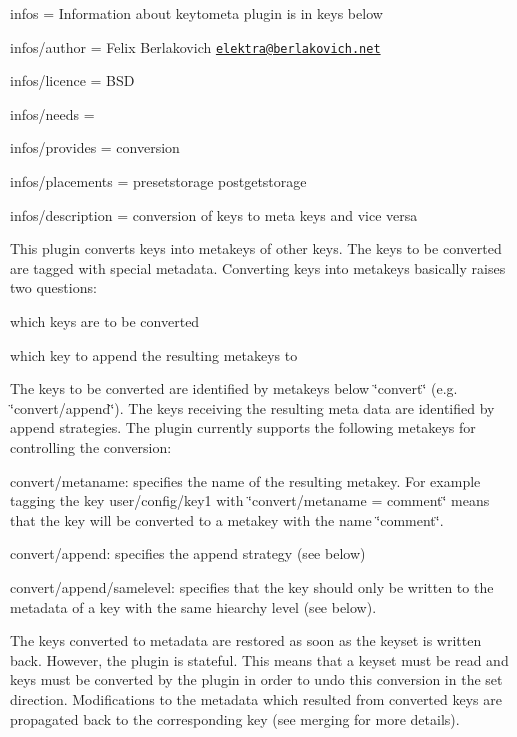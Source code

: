 
\begin{DoxyItemize}
\item infos = Information about keytometa plugin is in keys below
\item infos/author = Felix Berlakovich \href{mailto:elektra@berlakovich.net}{\tt elektra@berlakovich.\+net}
\item infos/licence = B\+S\+D
\item infos/needs =
\item infos/provides = conversion
\item infos/placements = presetstorage postgetstorage
\item infos/description = conversion of keys to meta keys and vice versa
\end{DoxyItemize}

This plugin converts keys into metakeys of other keys. The keys to be converted are tagged with special metadata. Converting keys into metakeys basically raises two questions\+:
\begin{DoxyItemize}
\item which keys are to be converted
\item which key to append the resulting metakeys to
\end{DoxyItemize}

The keys to be converted are identified by metakeys below \char`\"{}convert\char`\"{} (e.\+g. \char`\"{}convert/append\char`\"{}). The keys receiving the resulting meta data are identified by append strategies. The plugin currently supports the following metakeys for controlling the conversion\+:


\begin{DoxyItemize}
\item convert/metaname\+: specifies the name of the resulting metakey. For example tagging the key user/config/key1 with \char`\"{}convert/metaname = comment\char`\"{} means that the key will be converted to a metakey with the name \char`\"{}comment\char`\"{}.
\item convert/append\+: specifies the append strategy (see below)
\item convert/append/samelevel\+: specifies that the key should only be written to the metadata of a key with the same hiearchy level (see below).
\end{DoxyItemize}

The keys converted to metadata are restored as soon as the keyset is written back. However, the plugin is stateful. This means that a keyset must be read and keys must be converted by the plugin in order to undo this conversion in the set direction. Modifications to the metadata which resulted from converted keys are propagated back to the corresponding key (see merging for more details).

